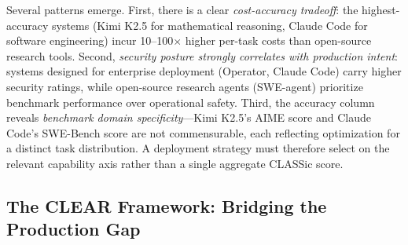 \begin{table}[tbp]
\centering
\footnotesize
{}
\caption{Empirical CLASSic scores for representative agentic systems (approximate values at time of writing). Cost estimates are derived from published API pricing and benchmark-reported task lengths; accuracy figures cite each system's primary public benchmark. Security and Stability are qualitative ratings based on published safety documentation and red-team disclosures.}
\label{tbl:classic-scores}
\end{table}

Several patterns emerge. First, there is a clear \emph{cost-accuracy tradeoff}: the highest-accuracy systems (Kimi K2.5 for mathematical reasoning, Claude Code for software engineering) incur 10--100$\times$ higher per-task costs than open-source research tools. Second, \emph{security posture strongly correlates with production intent}: systems designed for enterprise deployment (Operator, Claude Code) carry higher security ratings, while open-source research agents (SWE-agent) prioritize benchmark performance over operational safety. Third, the accuracy column reveals \emph{benchmark domain specificity}---Kimi K2.5's AIME score and Claude Code's SWE-Bench score are not commensurable, each reflecting optimization for a distinct task distribution. A deployment strategy must therefore select on the relevant capability axis rather than a single aggregate CLASSic score.

\subsection{The CLEAR Framework: Bridging the Production Gap}

